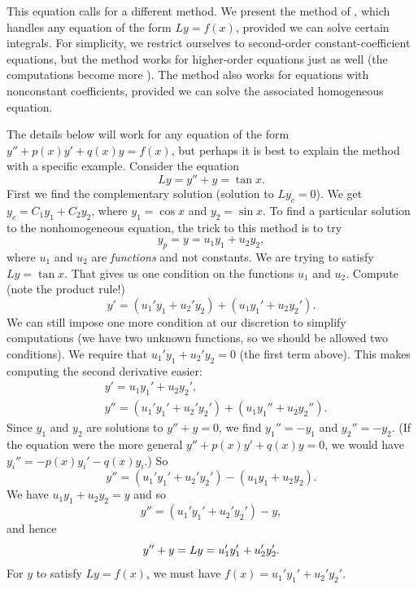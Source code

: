 This equation calls for a different method.  We present the method of
\emph{}, which handles any equation of
the form $Ly = f(x)$,
provided we can solve certain integrals.  For simplicity, we restrict
ourselves to second-order constant-coefficient equations,
but the method works for
higher-order equations just as well (the computations become more
). %
The method also works for equations with nonconstant coefficients,
provided we can solve the associated homogeneous equation.

The details below will work for any equation of the form
$y''+p(x)y' +q(x)y = f(x)$, but
perhaps it is best to explain the method with a specific example.
Consider the equation
\begin{equation*}
Ly = y''+y = \tan x .
\end{equation*}
First we find the complementary solution (solution to $Ly_c = 0$).  
We get $y_c = C_1 y_1 + C_2 y_2$, where $y_1 = \cos x$ and $y_2 = \sin x$.
To find a particular solution to the nonhomogeneous equation, 
the trick to this method is to try
\begin{equation*}
y_p = y = u_1 y_1 + u_2 y_2 ,
\end{equation*}
where $u_1$ and $u_2$ are \emph{functions} and not constants.
We are trying to satisfy $Ly = \tan x$.  That gives us one condition on the
functions $u_1$ and $u_2$.
Compute (note the product rule!)
\begin{equation*}
y' = (u_1' y_1 + u_2' y_2) + (u_1 y_1' + u_2 y_2').
\end{equation*}
We can still
impose one more condition at our discretion to simplify computations (we have two unknown functions,
so we should be allowed two conditions).  We require that
$u_1' y_1 + u_2' y_2 = 0$ (the first term above).
This makes computing the second derivative easier:
\begin{align*}
& y' = u_1 y_1' + u_2 y_2' , \\
& y'' = (u_1' y_1' + u_2' y_2') + (u_1 y_1'' + u_2 y_2'') .
\end{align*}
Since $y_1$ and $y_2$ are solutions to $y''+y = 0$, we find
$y_1'' = - y_1$
and $y_2'' = - y_2$.
(If the equation were the more general
$y''+p(x)y' +q(x)y = 0$, we would have
$y_i'' = -p(x)y_i' -q(x)y_i$.) So 
\begin{equation*}
y'' = (u_1' y_1' + u_2' y_2') - (u_1 y_1 + u_2 y_2) .
\end{equation*}
We have $u_1 y_1 + u_2 y_2 = y$ and so
\begin{equation*}
y'' = (u_1' y_1' + u_2' y_2') - y ,
\end{equation*}
and hence
\begin{equation*}
y'' + y = Ly = u_1' y_1' + u_2' y_2' .
\avoidbreak
\end{equation*}
For $y$ to satisfy $Ly = f(x)$, we must have
$f(x) = u_1' y_1' + u_2' y_2'$.


